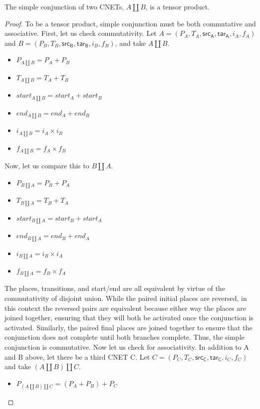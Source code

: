 \begin{lemma}
\label{lemma:REAL-AND-TENSOR-PRODUCT}
The simple conjunction of two CNETs, $A \amalg B$, is a tensor product.
\end{lemma}
\begin{proof}
To be a tensor product, simple conjunction must be both commutative and associative. First, let us check commutativity.
Let $A = (P_A, T_A, \mathsf{src_A}, \mathsf{tar_A}, i_A, f_A)$ and $B = (P_B, T_B, \mathsf{src_B}, \mathsf{tar_B}, i_B, f_B)$, and take $A \amalg B$.\\ 
\begin{itemize}
\item $P_{A \amalg B}= P_A + P_B$
\item $T_{A \amalg B} = T_A + T_B$
\item $start_{A \amalg B} = start_A + start_B$
\item $end_{A \amalg B} = end_A + end_B$
\item $i_{A \amalg B} = i_A \times i_B$
\item$f_{A \amalg B} = f_A \times f_B$
\end{itemize}
Now, let us compare this to ${B \amalg A}$.
\begin{itemize}
\item $P_{B \amalg A}= P_B + P_A$
\item $T_{B \amalg A} = T_B + T_A$
\item $start_{B \amalg A} = start_B + start_A$
\item $end_{B \amalg A} = end_B + end_A$
\item $i_{B \amalg A} = i_B \times i_A$
\item$f_{B \amalg A} = f_B \times f_A$
\end{itemize}
The places, transitions, and start/end are all equivalent by virtue of the commutativity of disjoint union. While the paired initial places are reversed, in this context the reversed pairs are equivalent because either way the places are joined together, ensuring that they will both be activated once the conjunction is activated. Similarly, the paired final places are joined together to ensure that the conjunction does not complete until both branches complete. Thus, the simple conjunction is commutative.
Now let us check for associativity. In addition to A and B above, let there be a third CNET C. Let $C = (P_C, T_C, \mathsf{src_C}, \mathsf{tar_C}, i_C, f_C)$ and take $(A \amalg B)\amalg C$.
\begin{itemize}
\item $P_{(A \amalg B)\amalg C}= (P_A + P_B) + P_C$

\end{itemize}
\end{proof}
